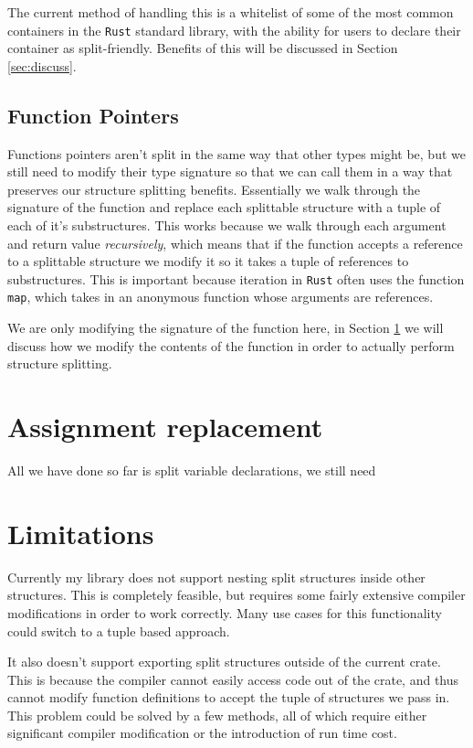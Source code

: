 \documentclass[12pt,oneside]{book}
\newcommand{\rustname}{{\texttt{Rust}}}
\def \rust {\rustname{}\xspace}
\begin{document}
The current method of handling this is a whitelist of some of the most common containers
in the \rust standard library, with the ability for users to declare their container as split-friendly.
Benefits of this will be discussed in Section \ref{sec:discuss}.

\subsection{Function Pointers}
Functions pointers aren't split in the same way that other types might be, but
we still need to modify their type signature so that we can call them in a way
that preserves our structure splitting benefits. Essentially we walk through the
signature of the function and replace each splittable structure with a tuple
of each of it's substructures. This works because we walk through each argument and 
return value \textit{recursively}, which means that if the function accepts a reference
to a splittable structure we modify it so it takes a tuple of references to substructures.
This is important because iteration in \rust often uses the function \texttt{map}, which
takes in an anonymous function whose arguments are references. 

We are only modifying the signature of the function here, in Section \ref{sec:assign} we will
discuss how we modify the contents of the function in order to actually perform structure
splitting.



\section{Assignment replacement}
\label{sec:assign}
All we have done so far is split variable declarations, we still need

\section{Limitations}
\label{sec:limits}
Currently my library does not support nesting split structures inside other structures.
This is completely feasible, but requires some fairly extensive compiler
modifications in order to work correctly. Many use cases for this functionality
could switch to a tuple based approach.

It also doesn't support exporting split structures outside of the current crate.
This is because the compiler cannot easily access code out of the crate, and
thus cannot modify function definitions to accept the tuple of structures we
pass in. This problem could be solved by a few methods, all of which require
either significant compiler modification or the introduction of run
time cost. 
\end{document}

